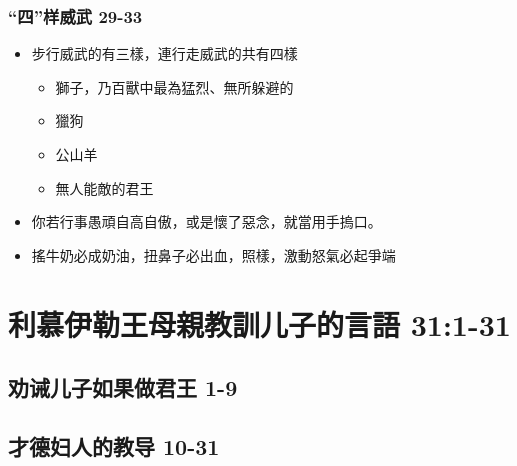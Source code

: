 \subsubsection{“四”样威武 29-33}
\begin{itemize}
\itemsep-.45em 
\item 步行威武的有三樣，連行走威武的共有四樣
\begin{itemize}
\itemsep-.45em 
\item 獅子，乃百獸中最為猛烈、無所躲避的
\item 獵狗
\item 公山羊
\item 無人能敵的君王
\end{itemize}
\item 你若行事愚頑自高自傲，或是懷了惡念，就當用手摀口。
\item 搖牛奶必成奶油，扭鼻子必出血，照樣，激動怒氣必起爭端
\end{itemize}


\section{利慕伊勒王母親教訓儿子的言語 31:1-31}
\subsection{劝诫儿子如果做君王 1-9}
\subsection{才德妇人的教导 10-31}
